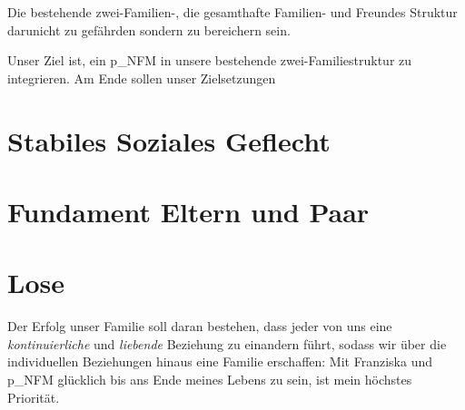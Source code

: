 \begin{itemize}
Die bestehende zwei-Familien-, die gesamthafte Familien- und Freundes Struktur  darunicht zu gefährden sondern zu bereichern sein.


Unser Ziel ist, ein \gls{p_NFM} in unsere bestehende zwei-Familiestruktur zu integrieren. 
Am Ende sollen unser Zielsetzungen

\section{Stabiles Soziales Geflecht}
\section{Fundament Eltern und Paar}





\section{Lose}
Der Erfolg unser Familie soll daran bestehen, dass jeder von uns eine \textit{kontinuierliche} und \textit{liebende} Beziehung zu einandern führt, sodass wir über die individuellen Beziehungen hinaus eine Familie erschaffen: Mit Franziska und \gls{p_NFM} glücklich bis ans Ende meines Lebens zu sein, ist mein höchstes Priorität.\\


\end{itemize}
